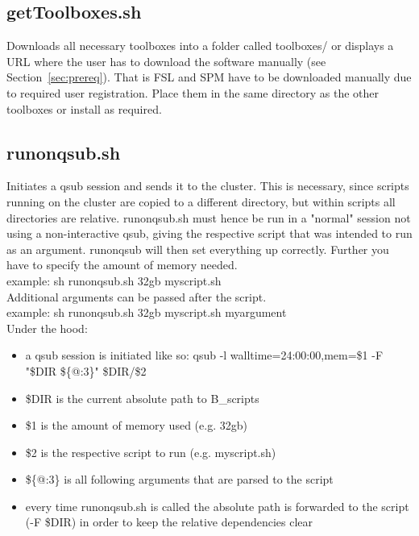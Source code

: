\documentclass[12pt,a4paper]{scrartcl}
\begin{document}
\subsection{getToolboxes.sh}
\label{sec:getTools}
Downloads all necessary toolboxes into a folder called toolboxes/ or displays a URL where the user has to download the software manually (see Section~\ref{sec:prereq}). That is FSL and SPM have to be downloaded manually due to required user registration. Place them in the same directory as the other toolboxes or install as required.

\subsection{runonqsub.sh}
Initiates a qsub session and sends it to the cluster. This is necessary, since scripts running on the cluster are copied to a different directory, but within scripts all directories are relative. runonqsub.sh must hence be run in a "normal" session not using a non-interactive qsub, giving the respective script that was intended to run as an argument. runonqsub will then set everything up correctly. Further you have to specify the amount of memory needed.\\

example: sh runonqsub.sh 32gb myscript.sh\\

\noindent Additional arguments can be passed after the script.\\

example: sh runonqsub.sh 32gb myscript.sh myargument\\

\noindent Under the hood:
\begin{itemize}
\item a qsub session is initiated like so: qsub -l walltime=24:00:00,mem=\$1 -F "\$DIR \$\{@:3\}" \$DIR/\$2
\item \$DIR is the current absolute path to B\_scripts
\item \$1 is the amount of memory used (e.g. 32gb)
\item \$2 is the respective script to run (e.g. myscript.sh)
\item \$\{@:3\} is all following arguments that are parsed to the script
\item every time runonqsub.sh is called the absolute path is forwarded to the script (-F \$DIR) in order to keep the relative dependencies clear
\end{itemize}
\end{document}
